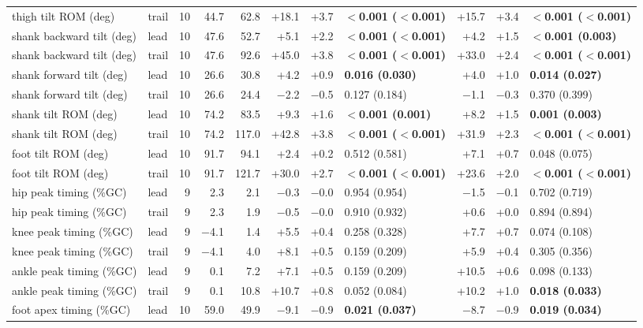 \begin{adjustbox}{max width=\textwidth}
{\begin{tabular}{llrrrrrlrrl}
thigh tilt ROM (deg) & trail & 10 & 44.7 & 62.8 & +18.1 & +3.7 & \textbf{$<$0.001 ($<$0.001)} & +15.7 & +3.4 & \textbf{$<$0.001 ($<$0.001)} \\
shank backward tilt (deg) & lead & 10 & 47.6 & 52.7 & +5.1 & +2.2 & \textbf{$<$0.001 ($<$0.001)} & +4.2 & +1.5 & \textbf{$<$0.001 (0.003)} \\
shank backward tilt (deg) & trail & 10 & 47.6 & 92.6 & +45.0 & +3.8 & \textbf{$<$0.001 ($<$0.001)} & +33.0 & +2.4 & \textbf{$<$0.001 ($<$0.001)} \\
shank forward tilt (deg) & lead & 10 & 26.6 & 30.8 & +4.2 & +0.9 & \textbf{0.016 (0.030)} & +4.0 & +1.0 & \textbf{0.014 (0.027)} \\
shank forward tilt (deg) & trail & 10 & 26.6 & 24.4 & $-$2.2 & $-$0.5 & 0.127 (0.184) & $-$1.1 & $-$0.3 & 0.370 (0.399) \\
shank tilt ROM (deg) & lead & 10 & 74.2 & 83.5 & +9.3 & +1.6 & \textbf{$<$0.001 (0.001)} & +8.2 & +1.5 & \textbf{0.001 (0.003)} \\
shank tilt ROM (deg) & trail & 10 & 74.2 & 117.0 & +42.8 & +3.8 & \textbf{$<$0.001 ($<$0.001)} & +31.9 & +2.3 & \textbf{$<$0.001 ($<$0.001)} \\
foot tilt ROM (deg) & lead & 10 & 91.7 & 94.1 & +2.4 & +0.2 & 0.512 (0.581) & +7.1 & +0.7 & 0.048 (0.075) \\
foot tilt ROM (deg) & trail & 10 & 91.7 & 121.7 & +30.0 & +2.7 & \textbf{$<$0.001 ($<$0.001)} & +23.6 & +2.0 & \textbf{$<$0.001 ($<$0.001)} \\
hip peak timing (\%GC) & lead & 9 & 2.3 & 2.1 & $-$0.3 & $-$0.0 & 0.954 (0.954) & $-$1.5 & $-$0.1 & 0.702 (0.719) \\
hip peak timing (\%GC) & trail & 9 & 2.3 & 1.9 & $-$0.5 & $-$0.0 & 0.910 (0.932) & +0.6 & +0.0 & 0.894 (0.894) \\
knee peak timing (\%GC) & lead & 9 & $-$4.1 & 1.4 & +5.5 & +0.4 & 0.258 (0.328) & +7.7 & +0.7 & 0.074 (0.108) \\
knee peak timing (\%GC) & trail & 9 & $-$4.1 & 4.0 & +8.1 & +0.5 & 0.159 (0.209) & +5.9 & +0.4 & 0.305 (0.356) \\
ankle peak timing (\%GC) & lead & 9 & 0.1 & 7.2 & +7.1 & +0.5 & 0.159 (0.209) & +10.5 & +0.6 & 0.098 (0.133) \\
ankle peak timing (\%GC) & trail & 9 & 0.1 & 10.8 & +10.7 & +0.8 & 0.052 (0.084) & +10.2 & +1.0 & \textbf{0.018 (0.033)} \\
foot apex timing (\%GC) & lead & 10 & 59.0 & 49.9 & $-$9.1 & $-$0.9 & \textbf{0.021 (0.037)} & $-$8.7 & $-$0.9 & \textbf{0.019 (0.034)} \\

\end{tabular}}
\end{adjustbox}
